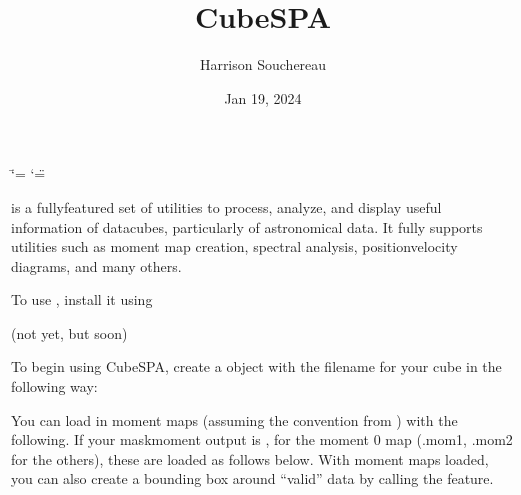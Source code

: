 \documentclass[letterpaper,10pt,english]{sphinxmanual}
\title{CubeSPA}
\date{Jan 19, 2024}
\author{Harrison Souchereau}
\begin{document}
\ifdefined\shorthandoff
  \ifnum\catcode`\=\string=\active\shorthandoff{=}\fi
  \ifnum\catcode`\"=\active{}\fi
\fi

\pagestyle{empty}
\sphinxmaketitle
\pagestyle{plain}
\sphinxtableofcontents
\pagestyle{normal}
\label{\detokenize{index::doc}}


\sphinxAtStartPar
{} is a fully\sphinxhyphen{}featured set of utilities to process, analyze, and display useful information of datacubes, particularly
of astronomical data. It fully supports utilities such as moment map creation, spectral analysis, position\sphinxhyphen{}velocity diagrams, and
many others.

\sphinxAtStartPar
To use , install it using

\sphinxAtStartPar
{} (not yet, but soon)

\sphinxAtStartPar
To begin using CubeSPA, create a  object with the filename for your cube in the following way:

\begin{sphinxVerbatim}[commandchars=\\\{\}]
  
  
\end{sphinxVerbatim}

\sphinxAtStartPar
You can load in moment maps (assuming the convention from   ) with the following. If your maskmoment output is
, for the moment 0 map (.mom1, .mom2 for the others), these are loaded as follows below. With
moment maps loaded, you can also create a bounding box around “valid” data by calling the  feature.

\begin{sphinxVerbatim}[commandchars=\\\{\}]
  
  
    
\end{sphinxVerbatim}
\end{document}

